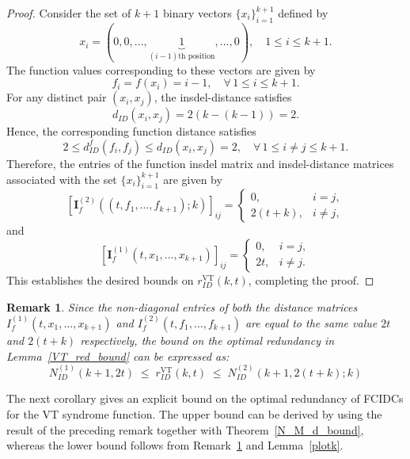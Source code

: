 \documentclass[11 pt]{article}
\numberwithin{equation}{section}
\newtheorem{remark}[theorem]{Remark}
\begin{document}
    \begin{proof}
        Consider the set of \( k + 1 \) binary vectors \( \{x_i\}_{i=1}^{k+1} \) defined by
        \[
            x_i = (0, 0, \ldots,\underbrace{1}_{(i-1)\text{th position}},\ldots, 0), \quad 1 \leq i \leq k + 1.
        \]
        The function values corresponding to these vectors are given by
        \[
            f_i = f(x_i) = i - 1, \quad \forall\, 1 \leq i \leq k + 1.
        \]
        For any distinct pair \( (x_i, x_j) \), the insdel-distance satisfies
        \[
            d_{ID}(x_i, x_j) = 2(k - (k - 1)) = 2.
        \]
        Hence, the corresponding function distance satisfies
        \[
            2 \leq d_{ID}^{f}(f_i, f_j) \leq d_{ID}(x_i, x_j) = 2, 
            \quad \forall\, 1 \leq i \neq j \leq k + 1.
        \]
        Therefore, the entries of the function insdel matrix and insdel-distance matrices associated with the set \( \{x_i\}_{i=1}^{k+1} \) are given by
        \[
            [\bm{I}_f^{(2)}((t, f_1, \ldots, f_{k+1}); k)]_{ij} =
            \begin{cases}
                0,       & i = j, \\[4pt]
                2(t + k), & i \neq j,
            \end{cases}
        \]
        and
        \[
            [\bm{I}_{f}^{(1)}(t, x_1, \ldots, x_{k+1})]_{ij} =
            \begin{cases}
                0,  & i = j, \\[4pt]
                2t, & i \neq j.
            \end{cases}
        \]
        This establishes the desired bounds on \( r^{\text{VT}}_{ID}(k, t) \), completing the proof.
    \end{proof}
    
    \begin{remark}\label{VT_N_M_d}
        Since the non-diagonal entries of both the distance matrices $I_{f}^{(1)}(t, x_1, \ldots, x_{k+1})$ and $I_{f}^{(2)}(t, f_1, \ldots, f_{k+1})$ are equal to the same value $2t$ and $2(t+k)$ respectively, the bound on the optimal redundancy in Lemma~\ref{VT_red_bound} can be expressed as:
        \[
            N_{ID}^{(1)}(k+1, 2t) 
            \;\leq\;
            r^{\text{VT}}_{ID}(k, t)
            \;\leq\;
            N_{ID}^{(2)}(k+1, 2(t+k); k)
        \]
    \end{remark}

    \noindent
    The next corollary gives an explicit bound on the optimal redundancy of FCIDCs for the VT syndrome function. The upper bound can be derived by using the result of the preceding remark together with Theorem~\ref{N_M_d_bound}, whereas the lower bound follows from Remark~\ref{VT_N_M_d} and Lemma~\ref{plotk}.
    
\end{document}
